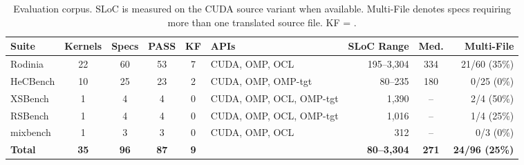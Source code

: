 \begin{table}[!tbp]
\centering
\caption{Evaluation corpus. SLoC is measured on the CUDA source variant when available. Multi-File denotes specs requiring more than one translated source file. KF = \knownfail{}.}
\label{tab:suite-summary}
\small
\setlength{\tabcolsep}{3.5pt}
\renewcommand{\arraystretch}{1.08}
\begin{tabularx}{\textwidth}{@{}lcccc>{\raggedright\arraybackslash}Xrcr@{}}
\toprule
Suite & Kernels & Specs & PASS & KF & APIs & SLoC Range & Med. & Multi-File \\
\midrule
Rodinia   & 22 & 60 & 53 & 7 & CUDA, OMP, OCL & 195--3{,}304 & 334 & 21/60 (35\%) \\
HeCBench  & 10 & 25 & 23 & 2 & CUDA, OMP, OMP-tgt & 80--235 & 180 & 0/25 (0\%) \\
XSBench   & 1  & 4  & 4  & 0 & CUDA, OMP, OCL, OMP-tgt & 1{,}390 & -- & 2/4 (50\%) \\
RSBench   & 1  & 4  & 4  & 0 & CUDA, OMP, OCL, OMP-tgt & 1{,}016 & -- & 1/4 (25\%) \\
mixbench  & 1  & 3  & 3  & 0 & CUDA, OMP, OCL & 312 & -- & 0/3 (0\%) \\
\midrule
\textbf{Total} & \textbf{35} & \textbf{96} & \textbf{87} & \textbf{9} & & \textbf{80--3{,}304} & \textbf{271} & \textbf{24/96 (25\%)} \\
\bottomrule
\end{tabularx}
\end{table}


